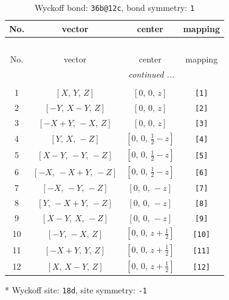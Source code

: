 \documentclass[fleqn,8pt]{jsarticle}
\begin{document}
\begin{longtable}{cccc}
\caption{Wyckoff bond: {\tt 36b@12c}, bond symmetry: {\tt 1}}
 \\
 \hline \hline
No. & vector & center & mapping \\ \hline \endfirsthead

\multicolumn{3}{l}{\tablename\ \thetable{}} \\
 \hline \hline
No. & vector & center & mapping \\ \hline \endhead

 \hline \hline
\multicolumn{3}{r}{\footnotesize\it continued ...} \\ \endfoot

 \hline \hline
\multicolumn{3}{r}{} \\ \endlastfoot

1 & $\left[ X,\, Y,\, Z \right]$ & $\left[ 0,\, 0,\, z \right]$ & {\tt [1]} \\ \hline
2 & $\left[ - Y,\, X - Y,\, Z \right]$ & $\left[ 0,\, 0,\, z \right]$ & {\tt [2]} \\ \hline
3 & $\left[ - X + Y,\, - X,\, Z \right]$ & $\left[ 0,\, 0,\, z \right]$ & {\tt [3]} \\ \hline
4 & $\left[ Y,\, X,\, - Z \right]$ & $\left[ 0,\, 0,\, \frac{1}{2} - z \right]$ & {\tt [4]} \\ \hline
5 & $\left[ X - Y,\, - Y,\, - Z \right]$ & $\left[ 0,\, 0,\, \frac{1}{2} - z \right]$ & {\tt [5]} \\ \hline
6 & $\left[ - X,\, - X + Y,\, - Z \right]$ & $\left[ 0,\, 0,\, \frac{1}{2} - z \right]$ & {\tt [6]} \\ \hline
7 & $\left[ - X,\, - Y,\, - Z \right]$ & $\left[ 0,\, 0,\, - z \right]$ & {\tt [7]} \\ \hline
8 & $\left[ Y,\, - X + Y,\, - Z \right]$ & $\left[ 0,\, 0,\, - z \right]$ & {\tt [8]} \\ \hline
9 & $\left[ X - Y,\, X,\, - Z \right]$ & $\left[ 0,\, 0,\, - z \right]$ & {\tt [9]} \\ \hline
10 & $\left[ - Y,\, - X,\, Z \right]$ & $\left[ 0,\, 0,\, z + \frac{1}{2} \right]$ & {\tt [10]} \\ \hline
11 & $\left[ - X + Y,\, Y,\, Z \right]$ & $\left[ 0,\, 0,\, z + \frac{1}{2} \right]$ & {\tt [11]} \\ \hline
12 & $\left[ X,\, X - Y,\, Z \right]$ & $\left[ 0,\, 0,\, z + \frac{1}{2} \right]$ & {\tt [12]} \\
\end{longtable}
* Wyckoff site: {\tt 18d}, site symmetry: {\tt -1}
\end{document}
